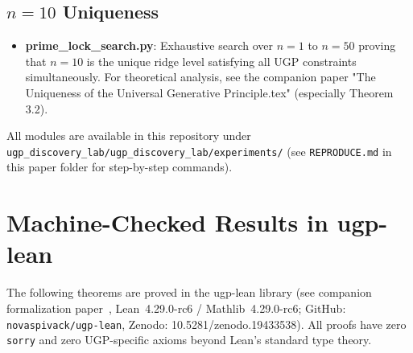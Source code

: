 \documentclass[11pt,twocolumn]{article}
\begin{document}
\subsection{$n=10$ Uniqueness}
\begin{itemize}[leftmargin=1.5em,itemsep=0.2em]
\item \textbf{prime\_lock\_search.py}: Exhaustive search over $n=1$ to $n=50$ proving that $n=10$ is the unique ridge level satisfying all UGP constraints simultaneously. For theoretical analysis, see the companion paper "The Uniqueness of the Universal Generative Principle.tex" (especially Theorem 3.2).
\end{itemize}

All modules are available in this repository under \texttt{ugp\_discovery\_lab/\allowbreak ugp\_discovery\_lab/\allowbreak experiments/} (see \texttt{REPRODUCE.md} in this paper folder for step-by-step commands).

\section{Machine-Checked Results in ugp-lean}
\label{app:lean_theorems}

The following theorems are proved in the ugp-lean library \cite{ugp-lean} (see companion formalization paper~\cite{SpivackUGPFormalization}, Lean~4.29.0-rc6 / Mathlib~4.29.0-rc6; GitHub: \texttt{novaspivack/ugp-lean}, Zenodo: 10.5281/zenodo.19433538). All proofs have zero \texttt{sorry} and zero UGP-specific axioms beyond Lean's standard type theory.
\end{document}

